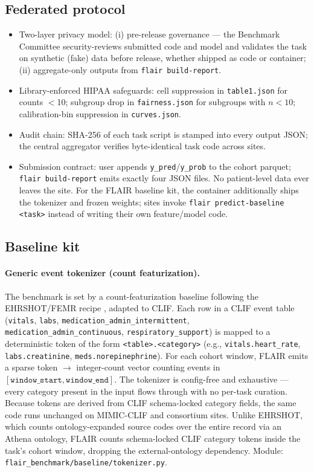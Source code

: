 \documentclass[11pt]{article}
\begin{document}
\subsection*{Federated protocol}
\begin{itemize}[leftmargin=1.5em]
  \item Two-layer privacy model: (i) pre-release governance --- the
        Benchmark Committee security-reviews submitted code and model and
        validates the task on synthetic (fake) data before release, whether
        shipped as code or container; (ii) aggregate-only outputs from
        \texttt{flair build-report}.
  \item Library-enforced HIPAA safeguards: cell suppression in
        \texttt{table1.json} for counts $<$10; subgroup drop in
        \texttt{fairness.json} for subgroups with $n<10$; calibration-bin
        suppression in \texttt{curves.json}.
  \item Audit chain: SHA-256 of each task script is stamped into every
        output JSON; the central aggregator verifies byte-identical task
        code across sites.
  \item Submission contract: user appends \texttt{y\_pred}/\texttt{y\_prob}
        to the cohort parquet; \texttt{flair build-report} emits exactly
        four JSON files. No patient-level data ever leaves the site.
        For the FLAIR baseline kit, the container additionally ships
        the tokenizer and frozen weights; sites invoke
        \texttt{flair predict-baseline <task>} instead of writing their
        own feature/model code.
\end{itemize}

\subsection*{Baseline kit}

\paragraph{Generic event tokenizer (count featurization).} The
benchmark is set by a count-featurization baseline following the
EHRSHOT/FEMR recipe \citep{wornow2023ehrshot,steinberg2021femr},
adapted to CLIF. Each row in a CLIF event table
(\texttt{vitals}, \texttt{labs},
\texttt{medication\_admin\_intermittent},
\texttt{medication\_admin\_continuous}, \texttt{respiratory\_support})
is mapped to a deterministic token of the form
\texttt{<table>.<category>} (e.g., \texttt{vitals.heart\_rate},
\texttt{labs.creatinine}, \texttt{meds.norepinephrine}). For each
cohort window, FLAIR emits a sparse token $\to$ integer-count vector
counting events in $[\texttt{window\_start}, \texttt{window\_end}]$.
The tokenizer is config-free and exhaustive --- every category present
in the input flows through with no per-task curation. Because tokens
are derived from CLIF schema-locked category fields, the same code
runs unchanged on MIMIC-CLIF and consortium sites. Unlike EHRSHOT,
which counts ontology-expanded source codes over the entire record via
an Athena ontology, FLAIR counts schema-locked CLIF category tokens
inside the task's cohort window, dropping the external-ontology
dependency. Module:
\texttt{flair\_benchmark/baseline/tokenizer.py}.
\end{document}
